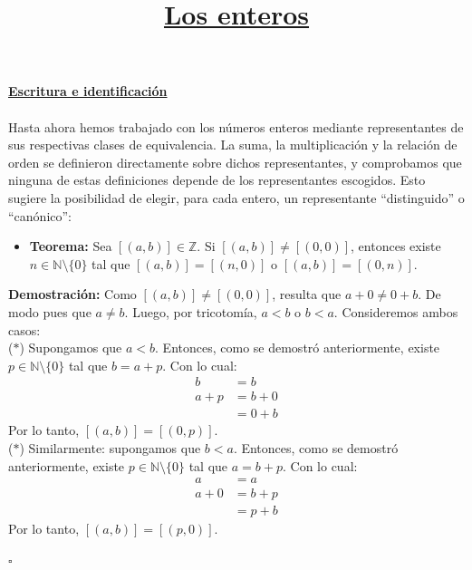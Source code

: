 \documentclass[10 pt]{article}
\title{\textbf{\underline{Los enteros}}}
\author{}
\date{}
\begin{document}
\pagestyle{empty}
\maketitle
\thispagestyle{empty}

\section*{}

\LARGE{\textbf{\underline{Escritura e identificación}}}\\ \\

\Large{Hasta ahora hemos trabajado con los números enteros mediante representantes de sus respectivas clases de equivalencia. La suma, la multiplicación y la relación de orden se definieron directamente sobre dichos representantes, y comprobamos que ninguna de estas definiciones depende de los representantes escogidos. Esto sugiere la posibilidad de elegir, para cada entero, un representante ``distinguido'' o ``canónico'':} \\

\begin{itemize}
    \item \Large{\textbf{Teorema:} Sea $[(a,b)] \in \mathbb Z$. Si $[(a,b)] \neq [(0,0)]$, entonces existe $n \in \mathbb N \setminus \{0\}$ tal que $[(a,b)]=[(n,0)]$ o $[(a,b)]=[(0,n)]$.} \\
\end{itemize}

\Large{\textbf{Demostración:} Como $[(a,b)] \neq [(0,0)]$, resulta que $a+0 \neq 0+b$. De modo pues que $a \neq b$. Luego, por tricotomía, $a<b$ o $b<a$. Consideremos ambos casos:} \\

\Large{($\ast$) Supongamos que $a<b$. Entonces, como se demostró anteriormente, existe $p \in \mathbb N \setminus \{0\}$ tal que $b=a+p$. Con lo cual:}
\begin{align*}
    b&=b \\
    a+p&=b+0 \\
    &=0+b
\end{align*}
\Large{Por lo tanto, $[(a,b)]=[(0,p)]$.} \\

\Large{($\ast$) Similarmente: supongamos que $b<a$. Entonces, como se demostró anteriormente, existe $p \in \mathbb N \setminus \{0\}$ tal que $a=b+p$. Con lo cual:}
\begin{align*}
    a&=a \\
    a+0&=b+p \\
    &=p+b
\end{align*}
\Large{Por lo tanto, $[(a,b)]=[(p,0)]$.} \\
\begin{flushright}
   $\square$
\end{flushright}
\end{document}
